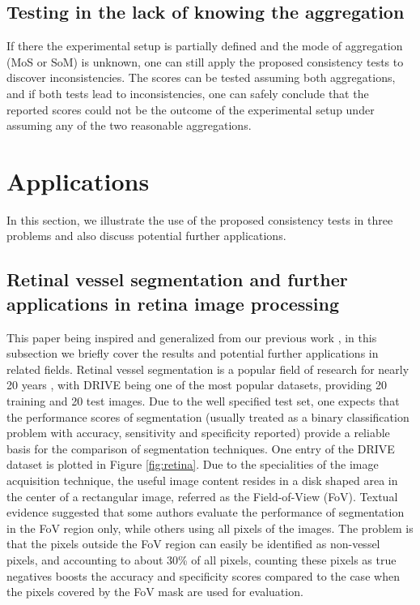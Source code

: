 \documentclass[5p, final]{elsarticle}
\begin{document}
\subsection{Testing in the lack of knowing the aggregation}
\label{sec:lackagg}

If there the experimental setup is partially defined and the mode of aggregation (MoS or SoM) is unknown, one can still apply the proposed consistency tests to discover inconsistencies. The scores can be tested assuming both aggregations, and if both tests lead to inconsistencies, one can safely conclude that the reported scores could not be the outcome of the experimental setup under assuming any of the two reasonable aggregations.


\section{Applications}
\label{sec:applications}

In this section, we illustrate the use of the proposed consistency tests in three problems and also discuss potential further applications.

\subsection{Retinal vessel segmentation and further applications in retina image processing}
\label{sec:retina}

This paper being inspired and generalized from our previous work \cite{vessel}, in this subsection we briefly cover the results and potential further applications in related fields. Retinal vessel segmentation is a popular field of research for nearly 20 years \cite{vessel}, with DRIVE \cite{drive} being one of the most popular datasets, providing 20 training and 20 test images. Due to the well specified test set, one expects that the performance scores of segmentation (usually treated as a binary classification problem with accuracy, sensitivity and specificity reported) provide a reliable basis for the comparison of segmentation techniques. One entry of the DRIVE dataset is plotted in Figure \ref{fig:retina}. Due to the specialities of the image acquisition technique, the useful image content resides in a disk shaped area in the center of a rectangular image, referred as the Field-of-View (FoV). Textual evidence suggested that some authors evaluate the performance of segmentation in the FoV region only, while others using all pixels of the images. The problem is that the pixels outside the FoV region can easily be identified as non-vessel pixels, and accounting to about 30\% of all pixels, counting these pixels as true negatives boosts the accuracy and specificity scores compared to the case when the pixels covered by the FoV mask are used for evaluation.
\end{document}
